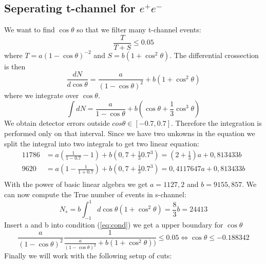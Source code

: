 \documentclass[]{article}
\begin{document}
\subsection{Seperating t-channel for $e^+ e^-$}
We want to find $\cos\theta$ so that we filter many t-channel events:
\begin{equation}
\frac{T}{T+S} \leq 0.05
\label{eq:cond}
\end{equation}
where  $T=a(1-\cos{\theta})^{-2}$  and $S=b(1+\cos^2{\theta})$. 
The differential crossection is then
\begin{equation}
\frac{dN}{d\cos\theta} = \frac{a}{(1-\cos\theta)^2}+b(1+\cos^2\theta)
\end{equation}
where we integrate over $\cos\theta$.
\begin{equation}
\int dN = \frac{a}{1-\cos\theta} + b\left(\cos\theta+\frac{1}{3}\cos^3\theta\right)
\end{equation}
We obtain detector errors outside $cos\theta \in [-0.7,0.7]$. Therefore the integration is performed only on that interval. Since we have two unkowns in the equation we split the integral into two integrals to get two linear equation:
\begin{equation}
\begin{split}
11786 &= a(\frac{1}{1-0.7}-1)+b(0,7+\frac{1}{3}0.7^3) =  (2+\frac{1}{3})a+0,813433b\\
9620 &= a(1-\frac{1}{1+0.7})+b(0,7+\frac{1}{3}0.7^3) = 0,4117647a+ 0,813433b\\
\end{split}
\end{equation}
With the power of basic linear algebra we get $a=1127,2$ and $b=9155,857$.
We can now compute the True number of events in s-channel:
\begin{equation}
N_s = b\int_{-1}^1 d\cos\theta (1+\cos^2\theta) = \frac{8}{3}b = 24413
\end{equation}
Insert a and b into condition (\ref{eq:cond}) we get a upper boundary for $\cos\theta$
\begin{equation}
\frac{a}{(1-\cos\theta)^2}\frac{1}{\frac{a}{(1-\cos\theta)^2}+b(1+\cos^2\theta))} \leq 0.05 \iff \cos\theta \leq -0.188342
\end{equation}
Finally we will work with the following setup of cuts:
\newline
\end{document}
